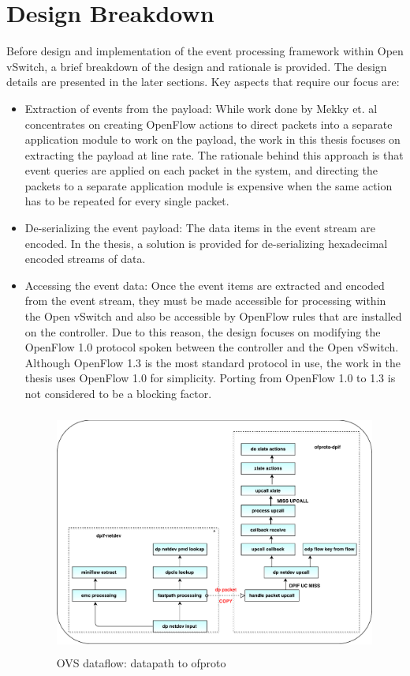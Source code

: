 \section{Design Breakdown}
Before design and implementation of the event processing framework within Open vSwitch, a brief breakdown of the design and rationale is provided. The design details are presented in the later sections. Key aspects that require our focus are:
\begin{itemize}
 \item Extraction of events from the payload: While work done by  Mekky et. al \cite{mekky2014application} concentrates on creating OpenFlow actions to direct packets into a separate application module to work on the payload, the work in this thesis focuses on extracting the payload at line rate. The rationale behind this approach is that event queries are applied on each packet in the system, and directing the packets to a separate application module is expensive when the same action has to be repeated for every single packet.
 \item De-serializing the event payload: The data items in the event stream are encoded. In the thesis, a solution is provided for de-serializing hexadecimal encoded streams of data. 
 \item Accessing the event data: Once the event items are extracted and encoded from the event stream, they must be made accessible for processing within the Open vSwitch and also be accessible by OpenFlow rules that are installed on the controller. Due to this reason, the design focuses on modifying the OpenFlow 1.0 protocol spoken between the controller and the Open vSwitch. Although OpenFlow 1.3 is the most standard protocol in use, the work in the thesis uses OpenFlow 1.0 for simplicity. Porting from OpenFlow 1.0 to 1.3 is not considered to be a blocking factor.
 \begin{figure}[H] 
 \centering   
 \caption{OVS dataflow: datapath to ofproto}
 \includegraphics[height=8cm]{dpnetdev.pdf}

\end{figure}
\end{itemize}
